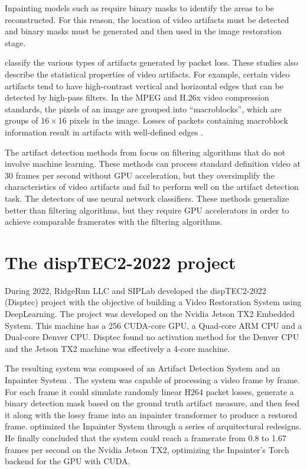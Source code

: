 Inpainting models such as \cite{Li2022,Brenes2022} require binary masks to identify the areas to be reconstructed. For this reason, the location of video artifacts must be detected and binary masks must be generated and then used in the image restoration stage.

\cite{Greengrass2009, Glavota2016} classify the various types of artifacts generated by packet loss. These studies also describe the statistical properties of video artifacts. For example, certain video artifacts tend to have high-contrast vertical and horizontal edges that can be detected by high-pass filters. In the MPEG and H.26x video compression standards, the pixels of an image are grouped into ``macroblocks'', which are groups of $16 \times 16$ pixels in the image. Losses of packets containing macroblock information result in artifacts with well-defined edges \cite{Vranjes2019, Glavota2018}.

The artifact detection methods from \cite{Vranjes2018, Glavota2018} focus on filtering algorithms that do not involve machine learning. These methods can process standard definition video at 30 frames per second without GPU acceleration, but they oversimplify the characteristics of video artifacts and fail to perform well on the artifact detection task. The detectors of \cite{Goodall2019, Rajasekar2020} use neural network classifiers. These methods generalize better than filtering algorithms, but they require GPU accelerators in order to achieve comparable framerates with the filtering algorithms.

\section{The dispTEC2-2022 project}
\label{sec:intro_disptec}

During 2022, RidgeRun LLC and SIPLab developed the dispTEC2-2022 (Disptec) project with the objective of building a Video Restoration System using DeepLearning. The project was developed on the Nvidia Jetson TX2 Embedded System. This machine has a 256 CUDA-core GPU, a Quad-core ARM CPU and a Dual-core Denver CPU. Disptec found no activation method for the Denver CPU and the Jetson TX2 machine was effectively a 4-core machine.

The resulting system was composed of an Artifact Detection System and an Inpainter System \cite{Brenes2022}. The system was capable of processing a video frame by frame. For each frame it could simulate randomly linear H264 packet losses, generate a binary detection mask based on the ground truth artifact measure, and then feed it along with the lossy frame into an inpainter transformer to produce a restored frame. \cite{Brenes2022} optimized the Inpainter System through a series of arquitectural redesigns. He finally concluded that the system could reach a framerate from 0.8 to 1.67 frames per second on the Nvidia Jetson TX2, optimizing the Inpainter's Torch backend for the GPU with CUDA.

